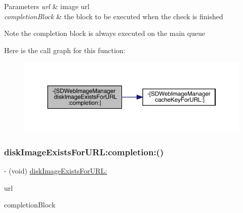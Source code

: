 \begin{DoxyParams}{Parameters}
{\em url} & image url \\
\hline
{\em completion\+Block} & the block to be executed when the check is finished\\
\hline
\end{DoxyParams}
\begin{DoxyNote}{Note}
the completion block is always executed on the main queue 
\end{DoxyNote}
Here is the call graph for this function\+:\nopagebreak
\begin{figure}[H]
\begin{center}
\leavevmode
\includegraphics[width=350pt]{interface_s_d_web_image_manager_a05c93459fc0727ca8e7139cfc9d9750c_cgraph}
\end{center}
\end{figure}
\mbox{\label{interface_s_d_web_image_manager_a05c93459fc0727ca8e7139cfc9d9750c}} 
\subsubsection{\texorpdfstring{disk\+Image\+Exists\+For\+U\+R\+L\+:completion\+:()}{diskImageExistsForURL:completion:()}\hspace{0.1cm}{\footnotesize\ttfamily [2/3]}}
{\footnotesize\ttfamily -\/ (void) \mbox{\hyperlink{interface_s_d_web_image_manager_a7ed53c304da787466f777c636447e6d0}{disk\+Image\+Exists\+For\+U\+R\+L\+:}} \begin{DoxyParamCaption}\item[{(N\+S\+U\+RL $\ast$)}]{url }\item[{completion:(S\+D\+Web\+Image\+Check\+Cache\+Completion\+Block)}]{completion\+Block }\end{DoxyParamCaption}}

